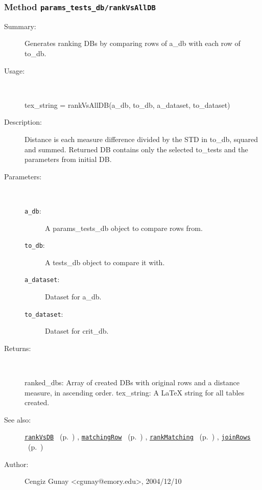 \subsubsection[Method \texttt{rankVsAllDB}]{Method \texttt{params\_tests\_db/rankVsAllDB}}%
%
\label{ref_params_tests_db__rankVsAllDB}%
\hypertarget{ref_params_tests_db__rankVsAllDB}{}%
\begin{description}
\item[Summary:]Generates ranking DBs by comparing rows of a\_db with each row of to\_db.
%
\item[Usage:]~%
\begin{lyxcode}%
tex\_string = rankVsAllDB(a\_db, to\_db, a\_dataset, to\_dataset)
%
\end{lyxcode}%
%
\item[Description:]%
Distance is each measure difference divided by the STD in to\_db, squared and
 summed. Returned DB contains only the selected to\_tests and the parameters
 from initial DB.
\item[Parameters:]~
\begin{description}%
\item[\texttt{a\_db}:]
 A params\_tests\_db object to compare rows from.
\item[\texttt{to\_db}:]
 A tests\_db object to compare it with.
\item[\texttt{a\_dataset}:]
 Dataset for a\_db.
\item[\texttt{to\_dataset}:]
 Dataset for crit\_db.
\end{description}%
%
\item[Returns:
]~

	ranked\_dbs: Array of created DBs with original rows and a distance 
		   measure, in ascending order. 
	tex\_string: A LaTeX string for all tables created.
%
%
\item[See also:]%
\hyperlink{ref_rankVsDB}{\texttt{rankVsDB}}%
\ (p.~\pageref{ref_rankVsDB})%
%
, \hyperlink{ref_matchingRow}{\texttt{matchingRow}}%
\ (p.~\pageref{ref_matchingRow})%
%
, \hyperlink{ref_rankMatching}{\texttt{rankMatching}}%
\ (p.~\pageref{ref_rankMatching})%
%
, \hyperlink{ref_joinRows}{\texttt{joinRows}}%
\ (p.~\pageref{ref_joinRows})%
%
%
\item[Author:]%
Cengiz Gunay <cgunay@emory.edu>, 2004/12/10
%
\end{description}
\methodline%
